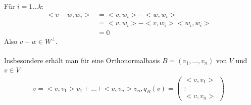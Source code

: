 Für $i = 1...k$:
\begin{align}
<v-w, w_i> &= <v, w_i> - <w, w_i> \\
&= <v, w_i> - <v, w_i> <w_i, w_i> \\
&= 0
\end{align}
Also $v-w \in W^{\perp}$.\\\\
Insbesondere erhält man für eine Orthonormalbasis $B = (v_1, ..., v_n)$ von $V$ und $v \in V$
\begin{align}
v = <v, v_1> v_1 + ... + <v, v_n> v_n, q_B(v) = \begin{pmatrix} <v, v_1> \\ \vdots \\ <v, v_n> \end{pmatrix}
\end{align}


